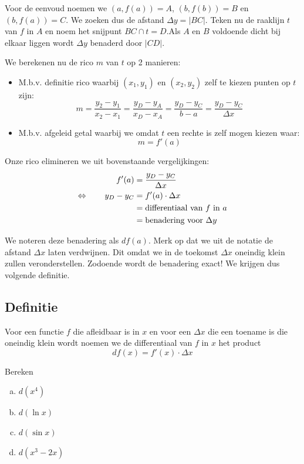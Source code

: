 \documentclass[a4paper,12pt, twoside]{article}
\begin{document}
Voor de eenvoud noemen we $(a,f(a))=A$, $(b,f(b))=B$ en $(b,f(a))=C$. We zoeken dus de afstand $\Delta y=|BC|$. Teken nu de raaklijn $t$ van $f$ in $A$ en noem het snijpunt $BC \cap t=D$.Als $A$ en $B$ voldoende dicht bij elkaar liggen wordt $\Delta y$ benaderd door $|CD|$.

We berekenen nu de rico $m$ van $t$ op 2 manieren:
\begin{itemize}
\item M.b.v. definitie rico waarbij $(x_1,y_1)$ en $(x_2, y_2)$ zelf te kiezen punten op $t$ zijn:
  $$m=\dfrac{y_2-y_1}{x_2-x_1}=\dfrac{y_D-y_A}{x_D-x_A}=\dfrac{y_D-y_C}{b-a}=\dfrac{y_D-y_C}{\Delta x}$$
\item M.b.v. afgeleid getal waarbij we omdat $t$ een rechte is zelf mogen kiezen waar:
  $$m = f'(a)$$
\end{itemize}

Onze rico elimineren we uit bovenstaande vergelijkingen:
\begin{align*}
     f'(a)       & = \dfrac{y_D-y_C}{\Delta x}                \\
\Leftrightarrow \qquad y_D - y_C & = f'(a)\cdot \Delta x                          \\
                 & = \mbox{differentiaal van $f$ in $a$} \\
                 & = \mbox{benadering voor $\Delta y$}        \\
\end{align*}

We noteren deze benadering als $df(a)$. Merk op dat we uit de notatie de afstand $\Delta x$ laten verdwijnen. Dit omdat we in de toekomst $\Delta x$ oneindig klein zullen veronderstellen. Zodoende wordt de benadering exact! We krijgen dus volgende definitie.

\subsection{Definitie}
Voor een functie $f$ die afleidbaar is in $x$ en voor een $\Delta x$ die een toename is die oneindig klein wordt noemen we de differentiaal van $f$ in $x$ het product
$$df(x)=f'(x)\cdot\Delta x$$

\begin{oefening}
Bereken
\begin{multicols}{2}
\begin{enumerate}[(a)]
  \itemsep1em
  \item $\displaystyle d(x^4)$
  \item $\displaystyle d(\ln x)$
  \item $\displaystyle d(\sin x)$
  \item $\displaystyle d(x^3-2x)$
\end{enumerate}
\end{multicols}
\end{oefening}
\end{document}
